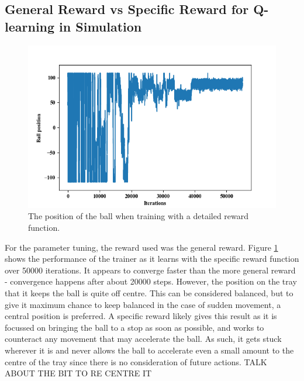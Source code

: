 \documentclass[12pt,a4paper]{article}
\begin{document}
\subsection{General Reward vs Specific Reward for Q-learning in Simulation}
\begin{figure}[H]
	\includegraphics{157}
	\caption{The position of the ball when training with a detailed reward function.}
	\label{f5}
\end{figure}
For the parameter tuning, the reward used was the general reward. Figure \ref{f5} shows the performance of the trainer as it learns with the specific reward function over 50000 iterations. It appears to converge faster than the more general reward - convergence happens after about 20000 steps. However, the position on the tray that it keeps the ball is quite off centre. This can be considered balanced, but to give it maximum chance to keep balanced in the case of sudden movement, a central position is preferred. A specific reward likely gives this result as it is focussed on bringing the ball to a stop as soon as possible, and works to counteract any movement that may accelerate the ball. As such, it gets stuck wherever it is and never allows the ball to accelerate even a small amount to the centre of the tray since there is no consideration of future actions. TALK ABOUT THE BIT TO RE CENTRE IT
\end{document}
